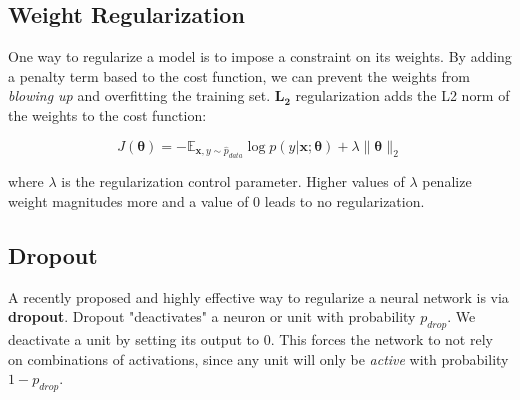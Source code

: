 \subsection{Weight Regularization}
One way to regularize a model is to impose a constraint on its weights. By adding a penalty term based to the cost function, we can prevent the weights
from \textit{blowing up} and overfitting the training set. $\bm{L_2}$ regularization
adds the L2 norm of the weights to the cost function:

\[J(\bm{\theta}) = -\mathbb{E}_{\bm{x},y \sim \hat p_{data}} \log \textit{p}(y|\bm{x};\bm{\theta}) + \lambda \lVert \bm{\theta} \rVert_{2}\]

where $\lambda$ is the regularization control parameter. Higher values of $\lambda$ penalize weight magnitudes more and a value of 0 leads to no regularization.

\subsection{Dropout}
A recently proposed and highly effective way to regularize a neural network is via \textbf{dropout}\cite{hinton2012improving}\cite{srivastava2014dropout}.
Dropout "deactivates" a neuron or unit with probability $p_{drop}$. We deactivate a unit
by setting its output to 0. This forces the network to not rely on combinations of
activations, since any unit will only be \textit{active} with probability $1-p_{drop}$.
